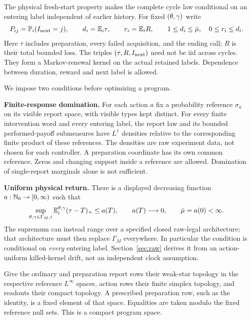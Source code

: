 The physical fresh-start property makes the complete cycle law conditional on an entering label independent of earlier history. For fixed $(\theta,\gamma)$ write
\begin{equation}\label{eq:cycle-data}
 P_{ij}=\mathbb P_i(I_{\rm next}=j),\qquad
 d_i=\mathbb E_i\tau,\qquad r_i=\mathbb E_i R,
 \qquad 1\le d_i\le\bar\mu,\quad 0\le r_i\le d_i.
\end{equation}
Here $\tau$ includes preparation, every failed acquisition, and the ending call; $R$ is their total bounded loss. The triples $(\tau,R,I_{\rm next})$ need not be iid across cycles. They form a Markov-renewal kernel on the actual retained labels. Dependence between duration, reward and next label is allowed.

We impose two conditions before optimizing a program.

\smallskip\noindent\textbf{Finite-response domination.}
For each action $a$ fix a probability reference $\sigma_a$ on its visible report space, with visible types kept distinct. For every finite intervention word and every entering label, the report law and its bounded performed-payoff submeasures have $L^1$ densities relative to the corresponding finite product of these references. The densities are raw experiment data, not chosen for each controller. A preparation coordinate has its own common reference. Zeros and changing support inside a reference are allowed. Domination of single-report marginals alone is not sufficient.

\smallskip\noindent\textbf{Uniform physical return.}
There is a displayed decreasing function $a:\mathbb N_0\to[0,\infty)$ such that
\begin{equation}\label{eq:tail}
 \sup_{\theta,\gamma\in\Gamma_M,i}\mathbb E_i^{\theta,\gamma}(\tau-T)_+
 \le a(T),\qquad a(T)\longrightarrow0,
 \qquad\bar\mu=a(0)<\infty.
\end{equation}
The supremum can instead range over a specified closed raw-legal architecture; that architecture must then replace $\Gamma_M$ everywhere. In particular the condition is conditional on \emph{every} entering label. Section~\ref{sec:raw} derives it from an action-uniform killed-kernel drift, not an independent clock assumption.

Give the ordinary and preparation report rows their weak-star topology in the respective reference $L^\infty$ spaces, action rows their finite simplex topology, and readouts their compact topology. A prescribed preparation row, such as the identity, is a fixed element of that space. Equalities are taken modulo the fixed reference null sets. This is a compact program space.

